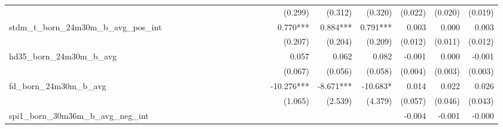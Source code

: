 \begin{tabular}{lrrrrrrrrrrrrrrrrrr}
                                            &              &              &              &              &              &              &              &              &               &              &              &               &      (0.299) &      (0.312) &       (0.320) &      (0.022) &      (0.020) &       (0.019) \\ 
stdm\_t\_born\_24m30m\_b\_avg\_pos\_int     &              &              &              &              &              &              &              &              &               &              &              &               &     0.770*** &     0.884*** &      0.791*** &        0.003 &        0.000 &         0.003 \\ 
                                            &              &              &              &              &              &              &              &              &               &              &              &               &      (0.207) &      (0.204) &       (0.209) &      (0.012) &      (0.011) &       (0.012) \\ 
hd35\_born\_24m30m\_b\_avg                  &              &              &              &              &              &              &              &              &               &              &              &               &        0.057 &        0.062 &         0.082 &       -0.001 &        0.000 &        -0.001 \\ 
                                            &              &              &              &              &              &              &              &              &               &              &              &               &      (0.067) &      (0.056) &       (0.058) &      (0.004) &      (0.003) &       (0.003) \\ 
fd\_born\_24m30m\_b\_avg                    &              &              &              &              &              &              &              &              &               &              &              &               &   -10.276*** &    -8.671*** &      -10.683* &        0.014 &        0.022 &         0.026 \\ 
                                            &              &              &              &              &              &              &              &              &               &              &              &               &      (1.065) &      (2.539) &       (4.379) &      (0.057) &      (0.046) &       (0.043) \\ 
spi1\_born\_30m36m\_b\_avg\_neg\_int        &              &              &              &              &              &              &              &              &               &              &              &               &              &              &               &       -0.004 &       -0.001 &        -0.000 \\ 

\end{tabular}
